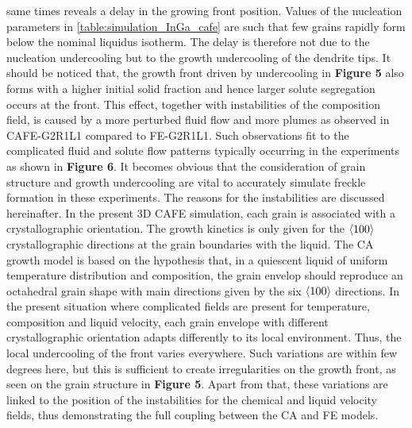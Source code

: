 same times reveals a delay in the growing front position. Values of the nucleation parameters in \cref{table:simulation_InGa_cafe} are such 
that few grains rapidly form below the nominal liquidus isotherm. The delay is therefore not due to the nucleation 
undercooling but to the growth undercooling of the dendrite tips. It should be noticed that, the growth front driven 
by undercooling in \textbf{Figure 5} also forms with a higher initial solid fraction and hence larger solute segregation occurs 
at the front. This effect, together with instabilities of the composition field, is caused by a more perturbed fluid flow 
and more plumes as observed in CAFE-G2R1L1 compared to FE-G2R1L1. Such observations fit to the complicated fluid and solute 
flow patterns typically occurring in the experiments as shown in \textbf{Figure 6}. It becomes obvious that the consideration of grain 
structure and growth undercooling are vital to accurately simulate freckle formation in these experiments. The reasons for the 
instabilities are discussed hereinafter. In the present 3D CAFE simulation, each grain is associated with a crystallographic orientation. 
The growth kinetics is only given for the $\langle 100 \rangle$ crystallographic directions at the grain boundaries with the liquid. The CA growth model 
is based on the hypothesis that, in a quiescent liquid of uniform temperature distribution and composition, the grain envelop should 
reproduce an octahedral grain shape with main directions given by the six $\langle 100 \rangle$ directions. In the present situation where complicated 
fields are present for temperature, composition and liquid velocity, each grain envelope with different crystallographic orientation 
adapts differently to its local environment. Thus, the local undercooling of the front varies everywhere. Such variations are within 
few degrees here, but this is sufficient to create irregularities on the growth front, as seen on the grain structure in \textbf{Figure 5}. 
Apart from that, these variations are linked to the position of the instabilities for the chemical and liquid velocity fields, thus 
demonstrating the full coupling between the CA and FE models.
%
%

